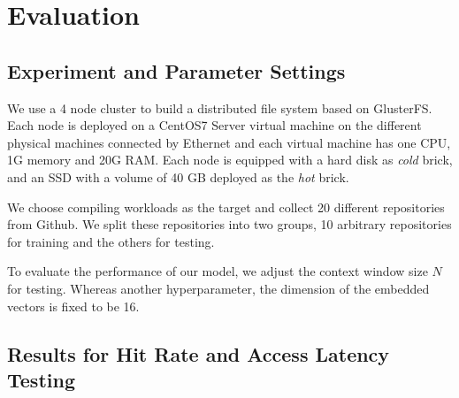 \documentclass[conference]{IEEEtran}
\begin{document}
\section{Evaluation}
\subsection{Experiment and Parameter Settings}
We use a 4 node cluster to build a distributed file system based on GlusterFS. 
Each node is deployed on a CentOS7 Server virtual machine on the different physical machines connected by Ethernet
and each virtual machine has one CPU, 1G memory and 20G RAM. Each node is equipped with a hard disk as \textit{cold} brick,
and an SSD with a volume of 40 GB deployed as the \textit{hot} brick.

We choose compiling workloads as the target and collect 20 different repositories from Github.
We split these repositories into two groups, 10 arbitrary repositories for training and the others for testing. 

To evaluate the performance of our model, we adjust the context window size $N$ for testing. 
Whereas another hyperparameter, the dimension of the embedded vectors is fixed to be 16. 
\subsection{Results for Hit Rate and Access Latency Testing}

    
\end{document}

